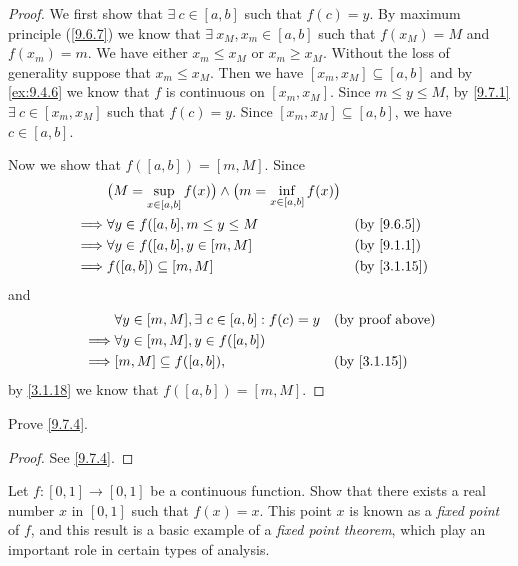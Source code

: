 \begin{proof}
  We first show that \(\exists\ c \in [a, b]\) such that \(f(c) = y\).
  By maximum principle (\cref{9.6.7}) we know that \(\exists\ x_M, x_m \in [a, b]\) such that \(f(x_M) = M\) and \(f(x_m) = m\).
  We have either \(x_m \leq x_M\) or \(x_m \geq x_M\).
  Without the loss of generality suppose that \(x_m \leq x_M\).
  Then we have \([x_m, x_M] \subseteq [a, b]\) and by \cref{ex:9.4.6} we know that \(f\) is continuous on \([x_m, x_M]\).
  Since \(m \leq y \leq M\), by \cref{9.7.1} \(\exists\ c \in [x_m, x_M]\) such that \(f(c) = y\).
  Since \([x_m, x_M] \subseteq [a, b]\), we have \(c \in [a, b]\).

  Now we show that \(f([a, b]) = [m, M]\).
  Since
  \begin{align*}
             & \big(M = \sup_{x \in [a, b]} f(x)\big) \land \big(m = \inf_{x \in [a, b]} f(x)\big)                                \\
    \implies & \forall y \in f([a, b], m \leq y \leq M                                             &  & \text{(by \cref{9.6.5})}  \\
    \implies & \forall y \in f([a, b], y \in [m, M]                                                &  & \text{(by \cref{9.1.1})}  \\
    \implies & f([a, b]) \subseteq [m, M]                                                          &  & \text{(by \cref{3.1.15})}
  \end{align*}
  and
  \begin{align*}
             & \forall y \in [m, M], \exists\ c \in [a, b] : f(c) = y &  & \text{(by proof above)}   \\
    \implies & \forall y \in [m, M], y \in f([a, b])                                                 \\
    \implies & [m, M] \subseteq f([a, b]),                            &  & \text{(by \cref{3.1.15})}
  \end{align*}
  by \cref{3.1.18} we know that \(f([a, b]) = [m ,M]\).
\end{proof}

\exercisesection

\begin{ex}\label{ex:9.7.1}
  Prove \cref{9.7.4}.
\end{ex}

\begin{proof}
  See \cref{9.7.4}.
\end{proof}

\begin{ex}\label{ex:9.7.2}
  Let \(f : [0, 1] \to [0, 1]\) be a continuous function.
  Show that there exists a real number \(x\) in \([0, 1]\) such that \(f(x) = x\).
  This point \(x\) is known as a \emph{fixed point} of \(f\), and this result is a basic example of a \emph{fixed point theorem}, which play an important role in certain types of analysis.
\end{ex}

